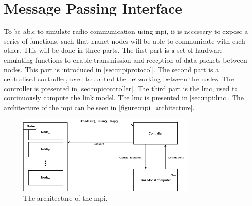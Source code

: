 \chapter{Message Passing Interface}

To be able to simulate radio communication using \gls{mpi}, it is necessary to expose a series of functions, such that \gls{manet} nodes will be able to communicate with each other. This will be done in three parts. The first part is a set of hardware emulating functions to enable transmission and reception of data packets between nodes. This part is introduced in \autoref{sec:mpiprotocol}. The second part is a centralised controller, used to control the networking between the nodes. The controller is presented in \autoref{sec:mpicontroller}. The third part is the \acrfull{lmc}, used to continuously compute the link model. The \acrlong{lmc} is presented in \autoref{sec:mpi:lmc}. The architecture of the \acrlong{mpi} can be seen in \autoref{figure:mpi_architecture}.

\begin{figure}[ht]
    \centering
    \includegraphics[width=0.8\textwidth]{figures/mpi_architecture.png}
    \caption{The architecture of the \acrlong{mpi}.}
    \label{figure:mpi_architecture}
\end{figure}






